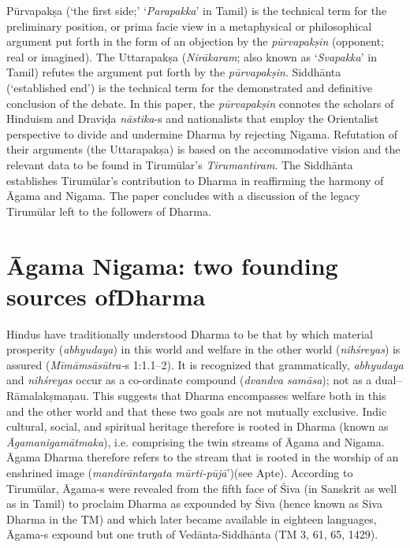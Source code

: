 Pūrvapakṣa (‘the first side;’ ‘\textit{Parapakka}’ in Tamil) is the technical term for the preliminary position, or prima facie view in a metaphysical or philosophical argument put forth in the form of an objection by the \textit{pūrvapakṣin} (opponent; real or imagined). The Uttarapakṣa (\textit{Nirākaram}; also known as ‘\textit{Svapakka}’ in Tamil) refutes the argument put forth by the \textit{pūrvapakṣin}. Siddhānta (‘established end’) is the technical term for the demonstrated and definitive conclusion of the debate. In this paper, the \textit{pūrvapakṣin} connotes the scholars of Hinduism and Draviḍa \textit{nāstika}-s and nationalists that employ the Orientalist perspective to divide and undermine Dharma by rejecting Nigama. Refutation of their arguments (the Uttarapakṣa) is based on the accommodative vision and the relevant data to be found in Tirumūlar’s \textit{Tirumantiram}. The Siddhānta establishes Tirumūlar’s contribution to Dharma in reaffirming the harmony of Āgama and Nigama. The paper concludes with a discussion of the legacy Tirumūlar left to the followers of Dharma.


\section*{Āgama Nigama: two founding sources of\hfill \break Dharma}

Hindus have traditionally understood Dharma to be that by which material prosperity (\textit{abhyudaya}) in this world and welfare in the other world (\textit{nihśreyas}) is assured (\textit{Mīmāmsāsūtra-}s 1:1.1–2). It is recognized that grammatically, \textit{abhyudaya} and \textit{nihśreyas} occur as a co-ordinate compound (\textit{dvandva samāsa}); not as a dual--Rāmalakṣmaṇau. This suggests that Dharma encompasses welfare both in this and the other world and that these two goals are not mutually exclusive. Indic cultural, social, and spiritual heritage therefore is rooted in Dharma (known as \textit{Āgamanigamātmaka}), i.e. comprising the twin streams of Āgama and Nigama. Āgama Dharma therefore refers to the stream that is rooted in the worship of an enshrined image (\textit{mandirāntargata mūrti-pūjā}’)(see Apte). According to Tirumūlar, Āgama-s were revealed from the fifth face of Śiva (in Sanskrit as well as in Tamil) to proclaim Dharma as expounded by Śiva (hence known as Siva Dharma in the TM) and which later became available in eighteen languages, Āgama-s expound but one truth of Vedānta-Siddhānta (TM 3, 61, 65, 1429).

